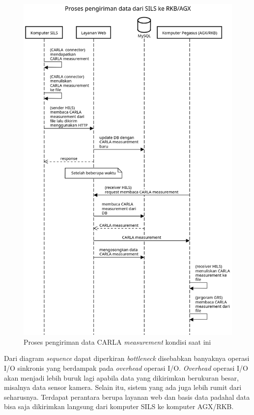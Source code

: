 \begin{figure}[h!]
	\centering
	\includegraphics[width=1.0\textwidth]{resources/chapter-3/sequence-diagram-old-hils-process.png}
	\caption{Proses pengiriman data CARLA \textit{measurement} kondisi saat ini}
	\label{chapter-3-sequence-diagram-old-hils}
\end{figure}

Dari diagram \textit{sequence} dapat diperkiran \textit{bottleneck} disebabkan
banyaknya operasi I/O sinkronis yang berdampak pada \textit{overhead} operasi
I/O. \textit{Overhead} operasi I/O akan menjadi lebih buruk lagi apabila data
yang dikirimkan berukuran besar, misalnya data sensor kamera. Selain itu, sistem
yang ada juga lebih rumit dari seharusnya. Terdapat perantara berupa layanan web
dan basis data padahal data bisa saja dikirimkan langsung dari komputer SILS ke
komputer AGX/RKB.

